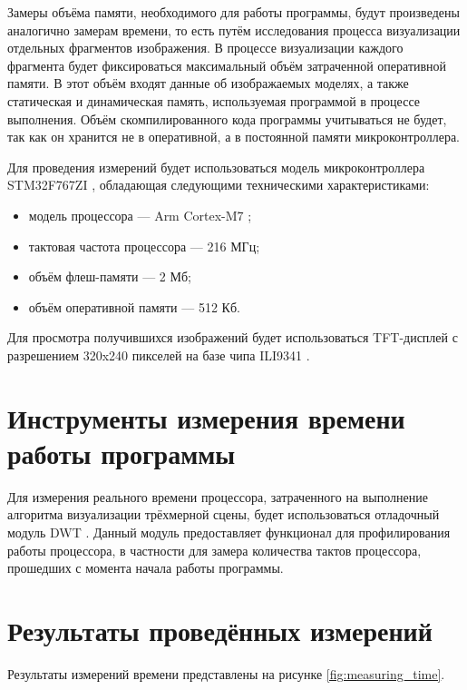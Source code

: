 Замеры объёма памяти, необходимого для работы программы, будут произведены аналогично замерам времени, то есть путём исследования 
процесса визуализации отдельных фрагментов изображения. В процессе визуализации каждого фрагмента будет фиксироваться максимальный 
объём затраченной оперативной памяти. В этот объём входят данные об изображаемых моделях, а также статическая и динамическая память, 
используемая программой в процессе выполнения. Объём скомпилированного кода программы учитываться не будет, так как он хранится 
не в оперативной, а в постоянной памяти микроконтроллера.

Для проведения измерений будет использоваться модель микроконтроллера STM32F767ZI \cite{STM32F767ZI}, обладающая следующими 
техническими характеристиками:
\begin{itemize}
	\item модель процессора --- Arm Cortex-M7 \cite{cortex_m7};
	\item тактовая частота процессора --- 216 МГц;
	\item объём флеш-памяти --- 2 Мб;
    \item объём оперативной памяти --- 512 Кб.
\end{itemize}

Для просмотра получившихся изображений будет использоваться TFT-дисплей с разрешением 320x240 пикселей на базе чипа ILI9341 \cite{ili9341}.



\section{Инструменты измерения времени работы программы}
Для измерения реального времени процессора, затраченного на выполнение алгоритма визуализации трёхмерной сцены, будет использоваться 
отладочный модуль DWT \cite{dwt}. Данный модуль предоставляет функционал для профилирования работы процессора, в частности для замера 
количества тактов процессора, прошедших с момента начала работы программы.



\section{Результаты проведённых измерений}
Результаты измерений времени представлены на рисунке \ref{fig:measuring_time}.

        
